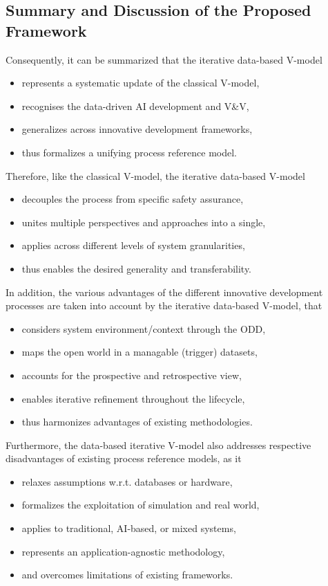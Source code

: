 \subsection{Summary and Discussion of the Proposed Framework}

Consequently, it can be summarized that the iterative data-based V-model
\begin{itemize}
	\item represents a systematic update of the classical V-model,
	\item recognises the data-driven AI development and V\&V,
	\item generalizes across innovative development frameworks,
	\item thus formalizes a unifying process reference model.
\end{itemize}

Therefore, like the classical V-model, the iterative data-based V-model
\begin{itemize}
	\item decouples the process from specific safety assurance,
	\item unites multiple perspectives and approaches into a single,
	\item applies across different levels of system granularities,
	\item thus enables the desired generality and transferability.
\end{itemize}

In addition, the various advantages of the different innovative development processes are taken into account by the iterative data-based V-model, that 
\begin{itemize}
	\item considers system environment/context through the ODD,
	\item maps the open world in a managable (trigger) datasets,
	\item accounts for the prospective and retrospective view,
	\item enables iterative refinement throughout the lifecycle,
	\item thus harmonizes advantages of existing methodologies.
\end{itemize}

Furthermore, the data-based iterative V-model also addresses respective disadvantages of existing process reference models, as it
\begin{itemize}
	\item relaxes assumptions w.r.t. databases or hardware,
	\item formalizes the exploitation of simulation and real world,
	\item applies to traditional, AI-based, or mixed systems,
	\item represents an application-agnostic methodology,
	\item and overcomes limitations of existing frameworks.
\end{itemize}

